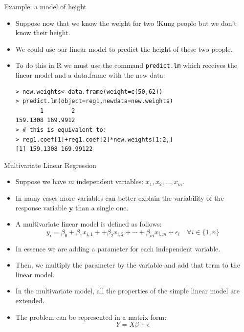 \documentclass[handout]{beamer}
\begin{document}
\begin{frame}[fragile]{Example: a model of height}
\scriptsize{
\begin{itemize}
\item  Suppose now that we know the weight for two !Kung people but we don't know their height.

\item  We could use our linear model to predict the height of these two people.

\item To do this in R we must use the command \verb+predict.lm+ which receives the linear model and a data.frame with the new data:
\begin{verbatim}
> new.weights<-data.frame(weight=c(50,62))
> predict.lm(object=reg1,newdata=new.weights)
       1        2 
159.1308 169.9912 
> # this is equivalent to:
> reg1.coef[1]+reg1.coef[2]*new.weights[1:2,]
[1] 159.1308 169.99122
\end{verbatim}

 
 \end{itemize}
 

} 
\end{frame}


\begin{frame}{Multivariate Linear Regression}
\scriptsize{
\begin{itemize}
 \item Suppose we have $m$ independent variables:  $x_1,x_2,\dots,x_m$.
 \item In many cases more variables can better explain the variability of the response variable $\mathbf{y}$ than a single one.
 \item A multivariate linear model is defined as follows:
 \begin{displaymath}
 y_i=\beta_{0}+\beta_{1}x_{i,1}+ +\beta_{2}x_{i,2} + \cdots + \beta_{m}x_{i,m} +  \epsilon_i \quad \forall i \in \{1,n\}
\end{displaymath}

\item In essence we are adding a parameter for each independent variable.

\item Then, we multiply the parameter by the variable and add that term to the linear model.

\item  In the multivariate model, all the properties of the simple linear model are extended.

\item The problem can be represented in a matrix form:
\begin{displaymath}
 Y=X\beta+\epsilon
\end{displaymath}








\end{itemize}
 

}
\end{frame}
\end{document}
